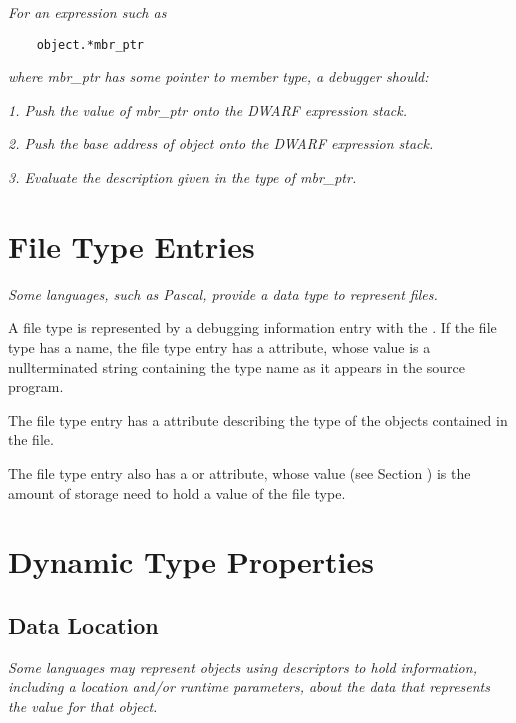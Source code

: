 \textit{For an expression such as}

\begin{lstlisting}
    object.*mbr_ptr
\end{lstlisting}
\textit{where mbr\_ptr has some pointer to member type, a debugger should:}

\textit{1. Push the value of mbr\_ptr onto the DWARF expression stack.}

\textit{2. Push the base address of object onto the DWARF expression stack.}

\textit{3. Evaluate the  description 
given in the type of mbr\_ptr.}

\section{File Type Entries}
\label{chap:filetypeentries}

\textit{Some languages, such as Pascal, provide a data type to represent 
files.}

A file type is represented by a debugging information entry
with the 
. 
If the file type has a name,
the file type entry has a  attribute, whose value
is a null\dash terminated string containing the type name as it
appears in the source program.

The file type entry has a  attribute describing
the type of the objects contained in the file.

The file type entry also has a  or
 attribute, whose value 
(see Section )
is the amount of storage need to hold a value of the file type.

\section{Dynamic Type Properties}
\label{chap:dynamictypeproperties}
\subsection{Data Location}
\label{chap:datalocation}

\textit{Some languages may represent objects using descriptors to hold
information, including a location and/or run\dash time parameters,
about the data that represents the value for that object.}

